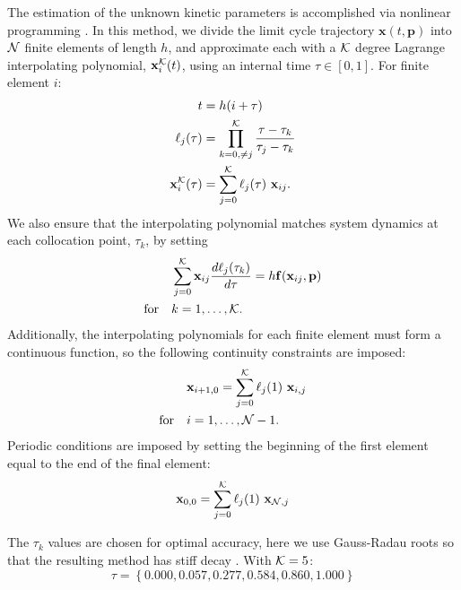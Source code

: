 The estimation of the unknown kinetic parameters is accomplished via nonlinear programming \cite{Biegler2010}. 
In this method, we divide the limit cycle trajectory ${\bm x}(t, {\bm p})$ into $\cal N$ finite elements of length $h$, and approximate each with a $\cal K$ degree Lagrange interpolating polynomial, ${\mathbf{x}}_i^{\cal K}(t)$, using an internal time $\tau \in [0,1]$. 
For finite element $i$:
\begin{equation}
  \begin{aligned} t &= h (i + \tau) \\ \ell_j(\tau) &= \prod^{\cal K}_{k=0,\ne j}
    \frac{\tau - \tau_k}{\tau_j - \tau_k}\\ {\mathbf{x}}_i^{\cal K}(\tau) &= \sum^{\cal K}_{j=0}
    \ell_j(\tau) \ {\mathbf{x}}_{ij}.
\end{aligned}
\end{equation}
We also ensure that the interpolating polynomial matches system dynamics at each collocation point, $\tau_k$, by setting
\begin{equation} \label{eq:collocation}
  \begin{aligned} &\sum^{\cal K}_{j=0} {\mathbf{x}}_{ij}\frac{d\ell_j(\tau_k)}{d\tau} = h
    {\mathbf{f}}({\mathbf{x}}_{ij},{\mathbf{p}}) \\ \textrm{for}\quad &k = 1, \ldots, {\cal K}.
  \end{aligned}
\end{equation}
Additionally, the interpolating polynomials for each finite element must form a continuous function, so the following continuity constraints are imposed:
\begin{equation} \label{eq:cont}
  \begin{aligned} &{\mathbf{x}}_{i+1,0} = \sum_{j = 0}^{\cal K} \ell_j(1) \ {\mathbf{x}}_{i,j} \\
    \textrm{for}\quad &i = 1,\ldots,{\cal N}-1.
  \end{aligned}
\end{equation}
Periodic conditions are imposed by setting the beginning of the first element equal to the end of the final element:
\begin{equation} \label{eq:periodic}
  {\mathbf{x}}_{0,0} = \sum_{j = 0}^{{\cal K}} \ell_j(1) \ {\mathbf{x}}_{{\cal N},j}
\end{equation}

The $\tau_k$ values are chosen for optimal accuracy, here we use Gauss-Radau roots so that the resulting method has stiff decay \cite{Biegler2010}. 
With ${\cal K} = 5$: $$ \tau = \left\{0.000, 0.057, 0.277, 0.584, 0.860, 1.000\right\} $$

